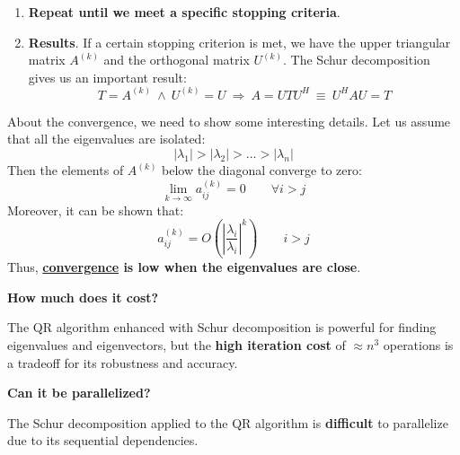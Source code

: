 \begin{enumerate}
    \item \textbf{Repeat until we meet a specific stopping criteria}.
    
    \item \textbf{Results}. If a certain stopping criterion is met, we have the upper triangular matrix $A^{\left(k\right)}$ and the orthogonal matrix $U^{\left(k\right)}$. The Schur decomposition gives us an important result:
    \begin{equation*}
        T = A^{\left(k\right)} \: \land \: U^{\left(k\right)} = U \: \Longrightarrow \: A = U T U^{H} \: \equiv \: U^{H} A U = T
    \end{equation*}
\end{enumerate}
About the convergence, we need to show some interesting details. Let us assume that all the eigenvalues are isolated:
\begin{equation*}
    \left|\lambda_{1}\right| > \left|\lambda_{2}\right| > \dots > \left|\lambda_{n}\right|
\end{equation*}
Then the elements of $A^{\left(k\right)}$ below the diagonal converge to zero:
\begin{equation*}
    \lim\limits_{k \rightarrow \infty} a_{ij}^{\left(k\right)} = 0 \hspace{2em} \forall i > j
\end{equation*}
Moreover, it can be shown that:
\begin{equation*}
    a_{ij}^{\left(k\right)} = O\left(
        \left|\dfrac{\lambda_{i}}{\lambda_{i}}\right|^{k}
    \right) \hspace{2em} i > j
\end{equation*}
Thus, \textbf{\underline{convergence} is low when the eigenvalues are close}.

\highspace
\begin{flushleft}
    \textcolor{Red2}{ \textbf{How much does it cost?}}
\end{flushleft}
The QR algorithm enhanced with Schur decomposition is powerful for finding eigenvalues and eigenvectors, but the \textbf{high iteration cost} of $\approx n^{3}$ operations is a tradeoff for its robustness and accuracy.

\highspace
\begin{flushleft}
    \textcolor{Green3}{ \textbf{Can it be parallelized?}}
\end{flushleft}
The Schur decomposition applied to the QR algorithm is \textbf{difficult} to parallelize due to its sequential dependencies.